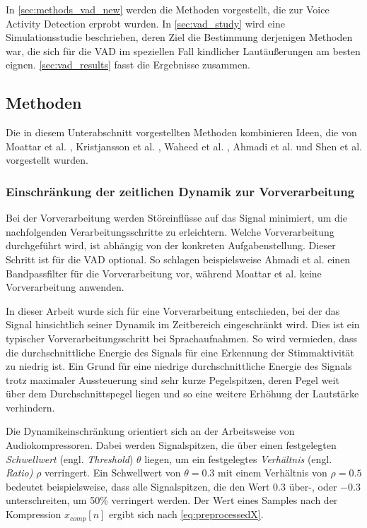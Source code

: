 In \autoref{sec:methods_vad_new} werden die Methoden vorgestellt, die zur Voice Activity Detection erprobt wurden. In \autoref{sec:vad_study} wird eine Simulationsstudie beschrieben, deren Ziel die Bestimmung derjenigen Methoden war, die sich für die VAD im speziellen Fall kindlicher Lautäußerungen am besten eignen. \autoref{sec:vad_results} fasst die Ergebnisse zusammen.

\subsection{Methoden}
\label{sec:methods_vad_new}

Die in diesem Unterabschnitt vorgestellten Methoden kombinieren Ideen, die von Moattar et al. \cite{vad_Easy}, Kristjansson et al. \cite{vad_Lisboa}, Waheed et al. \cite{vad_entropy}, Ahmadi et al. \cite{vad_ceps} und Shen et al. \cite{vad_entropie02} vorgestellt wurden.

\subsubsection{Einschränkung der zeitlichen Dynamik zur Vorverarbeitung}
\label{sec:preprocessing}

Bei der Vorverarbeitung werden Störeinflüsse auf das Signal minimiert, um die nachfolgenden Verarbeitungsschritte zu erleichtern. Welche Vorverarbeitung durchgeführt wird, ist abhängig von der konkreten Aufgabenstellung. Dieser Schritt ist für die VAD optional. So schlagen beispielsweise Ahmadi et al. \cite{vad_ceps} einen Bandpassfilter für die Vorverarbeitung vor, während Moattar et al. \cite{vad_Easy} keine Vorverarbeitung anwenden. 

In dieser Arbeit wurde sich für eine Vorverarbeitung entschieden, bei der das Signal hinsichtlich seiner Dynamik im Zeitbereich eingeschränkt wird. Dies ist ein typischer Vorverarbeitungsschritt bei Sprachaufnahmen. So wird vermieden, dass die durchschnittliche Energie des Signals für eine Erkennung der Stimmaktivität zu niedrig ist. Ein Grund für eine niedrige durchschnittliche Energie des Signals trotz maximaler Aussteuerung sind sehr kurze Pegelspitzen, deren Pegel weit über dem Durchschnittspegel liegen und so eine weitere Erhöhung der Lautstärke verhindern.\cite[S. 1 - 2]{schottland_comp}

Die Dynamikeinschränkung orientiert sich an der Arbeitsweise von Audiokompressoren. Dabei werden Signalspitzen, die über einen festgelegten \emph{Schwellwert} (engl. \emph{Threshold}) $\theta$ liegen, um ein festgelegtes \emph{Verhältnis} (engl. \emph{Ratio)} $\rho$ verringert. Ein Schwellwert von $\theta = 0.3$ mit einem Verhältnis von $\rho = 0.5$ bedeutet beispielsweise, dass alle Signalspitzen, die den Wert 0.3 über-, oder $-0.3$ unterschreiten, um 50\% verringert werden. Der Wert eines Samples nach der Kompression $x_{comp}[n]$ ergibt sich nach \autoref{eq:preprocessedX}.\cite[S. 400 - 401]{compressorPaper}

